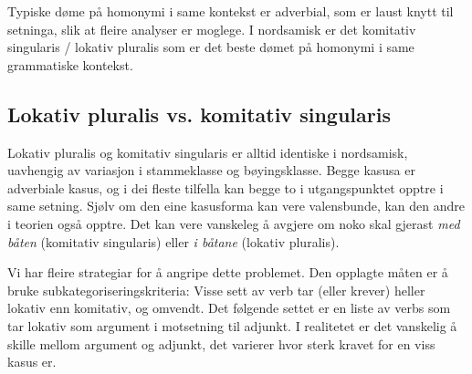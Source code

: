 \documentclass[a4paper,nynorsk]{article}
\begin{document}

Typiske døme på homonymi i same kontekst er adverbial, som er laust knytt til setninga, slik at fleire analyser er moglege. I nordsamisk er det komitativ singularis / lokativ pluralis som er det beste dømet på homonymi i same grammatiske kontekst. %





\subsection{Lokativ pluralis vs. komitativ singularis}


Lokativ pluralis og komitativ singularis er alltid identiske i nordsamisk, uavhengig av variasjon i stammeklasse og bøyingsklasse. Begge kasusa er adverbiale kasus, og i dei fleste tilfella kan begge to i utgangspunktet opptre i same setning. Sjølv om den eine kasusforma kan vere valensbunde, kan den andre i teorien også opptre. Det kan vere vanskeleg å avgjere om noko skal gjerast \textit{med båten} (komitativ singularis) eller \textit{i båtane} (lokativ pluralis). %



Vi har fleire strategiar for å angripe dette problemet. Den opplagte måten er å bruke subkategoriseringskriteria: Visse sett av verb tar (eller krever) heller lokativ enn komitativ, og omvendt. Det følgende settet er en liste av verbs som tar lokativ som argument i motsetning til adjunkt. I realitetet er det vanskelig å skille mellom argument og adjunkt, det varierer hvor sterk kravet for en viss kasus er. %
\end{document}
